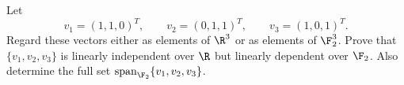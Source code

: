 Let
$$
    v_1=(1,1,0)^T,
    \qquad
    v_2=(0,1,1)^T,
    \qquad
    v_3=(1,0,1)^T.
$$
Regard these vectors either as elements of $\R^3$ or as elements of $\F_2^3$.  Prove that $\{v_1,v_2,v_3\}$ is linearly independent over $\R$ but linearly dependent over $\F_2$.  Also determine the full set $\operatorname{span}_{\F_2}\{v_1,v_2,v_3\}$.

